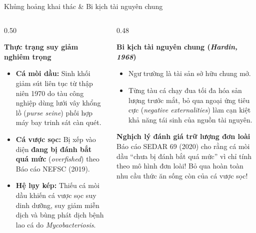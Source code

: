 \documentclass[aspectratio=169, 10pt]{beamer}
\begin{document}
\begin{frame}{Khủng hoảng khai thác \& Bi kịch tài nguyên chung}
  \begin{columns}[t]
    \begin{column}{0.50\textwidth}
      \begin{alertblock}{\textbf{Thực trạng suy giảm nghiêm trọng}}
        \footnotesize
        \begin{itemize}
          \item \textbf{Cá mòi dầu:} Sinh khối giảm sút liên tục từ thập niên 1970 do tàu công nghiệp dùng lưới vây khổng lồ (\textit{purse seine}) phối hợp máy bay trinh sát càn quét.
          \item \textbf{Cá vược sọc:} Bị xếp vào diện \textbf{đang bị đánh bắt quá mức} (\textit{overfished}) theo Báo cáo NEFSC (2019).
          \item \textbf{Hệ lụy kép:} Thiếu cá mòi dầu khiến cá vược sọc suy dinh dưỡng, suy giảm miễn dịch và bùng phát dịch bệnh lao cá do \textit{Mycobacteriosis}.
        \end{itemize}
      \end{alertblock}
    \end{column}

    \begin{column}{0.48\textwidth}
      \begin{block}{\textbf{Bi kịch tài nguyên chung (\textit{Hardin, 1968})}}
        \footnotesize
        \begin{itemize}
          \item Ngư trường là tài sản sở hữu chung mở.
          \item Từng tàu cá chạy đua tối đa hóa sản lượng trước mắt, bỏ qua ngoại ứng tiêu cực (\textit{negative externalities}) làm cạn kiệt khả năng tái sinh của nguồn tài nguyên.
        \end{itemize}
      \end{block}

      \vspace{0.1cm}

      \begin{exampleblock}{\textbf{Nghịch lý đánh giá trữ lượng đơn loài}}
        \footnotesize
        Báo cáo SEDAR 69 (2020) cho rằng cá mòi dầu ``chưa bị đánh bắt quá mức'' vì chỉ tính theo mô hình đơn loài! Bỏ qua hoàn toàn nhu cầu thức ăn sống còn của cá vược sọc!
      \end{exampleblock}
    \end{column}
  \end{columns}
\end{frame}
\end{document}
